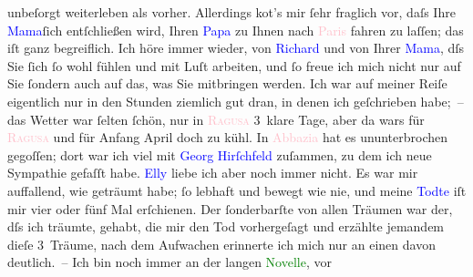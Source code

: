                unbeſorgt weiterleben als vorher. Allerdings ko{\geminationm}t’s {\pb}mir ſehr fraglich vor, daſs Ihre \textcolor{blue}{Mama}{}ſich entſchließen wird, Ihren \textcolor{blue}{Papa}{} zu Ihnen nach \textcolor{pink}{Paris}{}\ledrightnote{\textcolor{pink}{Paris}} fahren zu laſſen; das iſt ganz begreiflich. Ich höre immer wieder, von
                  \textcolor{blue}{Richard}{}\ledrightnote{\textcolor{blue}{Richard Beer-Hofmann}} und von Ihrer \textcolor{blue}{Mama}{}, dſs Sie ſich ſo wohl fühlen und mit Luſt
               arbeiten, und ſo freue ich mich nicht nur auf Sie ſondern auch auf das, was Sie
               mitbringen werden. Ich war auf meiner Reiſe eigentlich nur in den Stunden ziemlich
               gut dran, in denen ich geſchrieben habe; – {\pb}das Wetter
               war ſelten ſchön, nur in \textcolor{pink}{\textsc{Ragusa}}{}\ledrightnote{\textcolor{pink}{Dubrovnik}} 3 klare Tage, aber da wars für \textcolor{pink}{\textsc{Ragusa}}{}\ledrightnote{\textcolor{pink}{Dubrovnik}} und für Anfang April doch zu kühl. In \textcolor{pink}{Abbazia}{}\ledrightnote{\textcolor{pink}{Opatija}} hat es ununterbrochen gegoſſen; dort war ich viel mit
                  \textcolor{blue}{Georg Hirſchfeld}{}\ledrightnote{\textcolor{blue}{Georg Hirschfeld}} zuſammen, zu dem ich neue
               Sympathie gefaſſt habe. \textcolor{blue}{Elly}{}\ledrightnote{\textcolor{blue}{Elly Petersen}} liebe ich aber noch
               immer nicht. Es war mir auffallend, wie \label{K_L01031_1v}\label{K_L01031_1h} geträumt habe; ſo
               lebhaft und bewegt wie nie, und meine \textcolor{blue}{Todte}{} iſt mir vier oder fünf Mal erſchienen. {\pb}Der ſonderbarſte von allen Träumen war der, dſs ich träumte, \label{K_L01031_2v}\label{K_L01031_2h} gehabt, die
               mir den Tod vorhergeſagt und erzählte jemandem dieſe 3 Träume, nach dem Aufwachen
               erinnerte ich mich nur an einen davon deutlich. – Ich bin noch immer an der langen
                  \textcolor{green}{Novelle}{}, vor
